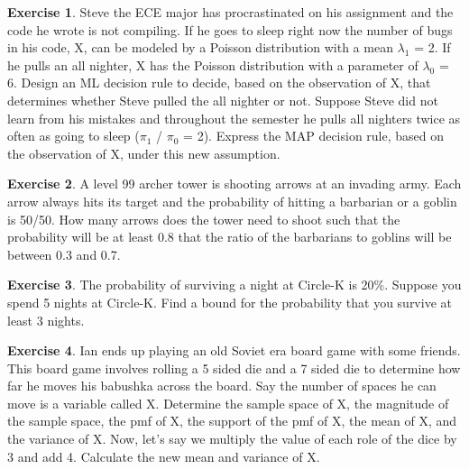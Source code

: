 \documentclass[12pt]{amsart}
\theoremstyle{definition}
\newtheorem{exercise}{Exercise}
\numberwithin{equation}{section}
\theoremstyle{plain}
\begin{document}
\begin{exercise}
Steve the ECE major has procrastinated on his assignment and the code he wrote is not compiling. If he goes to sleep right now the number of bugs in his code, X, can be modeled by a Poisson distribution with a mean $\lambda_1$ = 2. If he pulls an all nighter, X has the Poisson distribution with a parameter of $\lambda_0$ = 6. 
\newline
Design an ML decision rule to decide, based on the observation of X, that determines whether Steve pulled the all nighter or not.
\newline
Suppose Steve did not learn from his mistakes and throughout the semester he pulls all nighters twice as often as going to sleep ($\pi_1$ / $\pi_0$ = 2). Express the MAP decision rule, based on the observation of X, under this new assumption. 
\end{exercise}

\begin{exercise}
A level 99 archer tower is shooting arrows at an invading army. Each arrow always hits its target and the probability of hitting a barbarian or a goblin is 50/50. How many arrows does the tower need to shoot such that the probability will be at least 0.8 that the ratio of the barbarians to goblins will be between 0.3 and 0.7.
\end{exercise}

\begin{exercise}
The probability of surviving a night at Circle-K is 20\%. Suppose you spend 5 nights at Circle-K. Find a bound for the probability that you survive at least 3 nights.
\end{exercise}

\begin{exercise}
Ian ends up playing an old Soviet era board game with some friends. This board game involves rolling a 5 sided die and a 7 sided die to determine how far he moves his babushka across the board. Say the number of spaces he can move is a variable called X. Determine the sample space of X, the magnitude of the sample space, the pmf of X, the support of the pmf of X, the mean of X, and the variance of X.
\newline
Now, let's say we multiply the value of each role of the dice by 3 and add 4. Calculate the new mean and variance of X.
\end{exercise}
\end{document}
